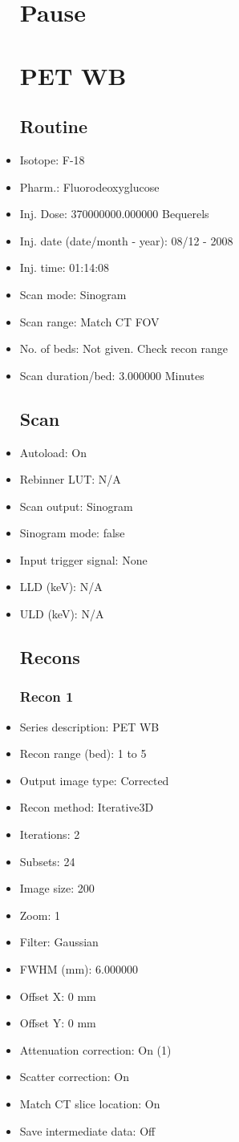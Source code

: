 \documentclass[12pt]{article}
\begin{document}
\begin{itemize}
\section{Pause}
\section{PET WB}\subsection{Routine}
\item Isotope: F-18
\item Pharm.: Fluorodeoxyglucose
\item Inj. Dose: 370000000.000000 Bequerels
\item Inj. date (date/month - year): 08/12 - 2008
\item Inj. time: 01:14:08
\item Scan mode: Sinogram
\item Scan range: Match CT FOV
\item No. of beds: Not given. Check recon range
\item Scan duration/bed: 3.000000 Minutes
\subsection{Scan}
\item Autoload: On
\item Rebinner LUT: N/A
\item Scan output: Sinogram
\item Sinogram mode: false
\item Input trigger signal: None
\item LLD (keV): N/A
\item ULD (keV): N/A
\subsection{Recons}
\subsubsection{Recon 1}
\item Series description: PET WB
\item Recon range (bed): 1 to 5
\item Output image type: Corrected
\item Recon method: Iterative3D
\item Iterations: 2
\item Subsets: 24
\item Image size: 200
\item Zoom: 1
\item Filter: Gaussian
\item FWHM (mm): 6.000000
\item Offset X: 0 mm
\item Offset Y: 0 mm
\item Attenuation correction: On (1)
\item Scatter correction: On
\item Match CT slice location: On
\item Save intermediate data: Off

\end{itemize}
\end{document}
